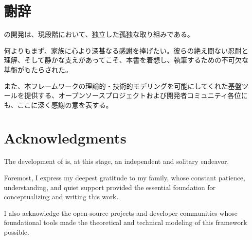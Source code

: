 \ifja
    \chapter*{謝辞}
    \label{chap:acknowledgments}
    
    \textbf{\fullSNLP}の開発は、現段階において、独立した孤独な取り組みである。

    何よりもまず、家族に心より深甚なる感謝を捧げたい。彼らの絶え間ない忍耐と理解、そして静かな支えがあってこそ、本書を着想し、執筆するための不可欠な基盤がもたらされた。

    また、本フレームワークの理論的・技術的モデリングを可能にしてくれた基盤ツールを提供する、オープンソースプロジェクトおよび開発者コミュニティ各位にも、ここに深く感謝の意を表する。
\else
    \chapter*{Acknowledgments}
    \label{chap:acknowledgments}
    
    The development of \textbf{\fullSNLP} is, at this stage, an independent and solitary endeavor. 

    Foremost, I express my deepest gratitude to my family, whose constant patience, understanding, and quiet support provided the essential foundation for conceptualizing and writing this work. 

    I also acknowledge the open-source projects and developer communities whose foundational tools made the theoretical and technical modeling of this framework possible.
\fi

